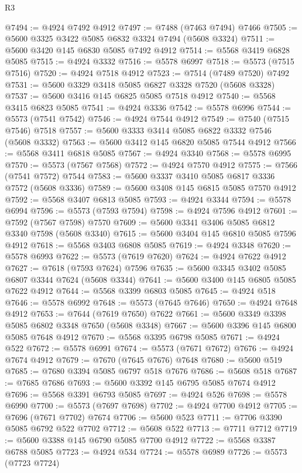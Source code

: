 \begin{lexlean}{R3}
\begin{coremodule}
@7494 := @4924 @7492 @4912
@7497 := @7488 (@7463 @7494) @7466
@7505 := @5600 @3325 @3422 @5085 @6832 @3324 @7494 (@5608 @3324)
@7511 := @5600 @3420 @145 @6830 @5085 @7492 @4912
@7514 := @5568 @3419 @6828 @5085
@7515 := @4924 @3332
@7516 := @5578 @6997
@7518 := @5573 (@7515 @7516)
@7520 := @4924 @7518 @4912
@7523 := @7514 (@7489 @7520) @7492
@7531 := @5600 @3329 @3418 @5085 @6827 @3328 @7520 (@5608 @3328)
@7537 := @5600 @3416 @145 @6825 @5085 @7518 @4912
@7540 := @5568 @3415 @6823 @5085
@7541 := @4924 @3336
@7542 := @5578 @6996
@7544 := @5573 (@7541 @7542)
@7546 := @4924 @7544 @4912
@7549 := @7540 (@7515 @7546) @7518
@7557 := @5600 @3333 @3414 @5085 @6822 @3332 @7546 (@5608 @3332)
@7563 := @5600 @3412 @145 @6820 @5085 @7544 @4912
@7566 := @5568 @3411 @6818 @5085
@7567 := @4924 @3340
@7568 := @5578 @6995
@7570 := @5573 (@7567 @7568)
@7572 := @4924 @7570 @4912
@7575 := @7566 (@7541 @7572) @7544
@7583 := @5600 @3337 @3410 @5085 @6817 @3336 @7572 (@5608 @3336)
@7589 := @5600 @3408 @145 @6815 @5085 @7570 @4912
@7592 := @5568 @3407 @6813 @5085
@7593 := @4924 @3344
@7594 := @5578 @6994
@7596 := @5573 (@7593 @7594)
@7598 := @4924 @7596 @4912
@7601 := @7592 (@7567 @7598) @7570
@7609 := @5600 @3341 @3406 @5085 @6812 @3340 @7598 (@5608 @3340)
@7615 := @5600 @3404 @145 @6810 @5085 @7596 @4912
@7618 := @5568 @3403 @6808 @5085
@7619 := @4924 @3348
@7620 := @5578 @6993
@7622 := @5573 (@7619 @7620)
@7624 := @4924 @7622 @4912
@7627 := @7618 (@7593 @7624) @7596
@7635 := @5600 @3345 @3402 @5085 @6807 @3344 @7624 (@5608 @3344)
@7641 := @5600 @3400 @145 @6805 @5085 @7622 @4912
@7644 := @5568 @3399 @6803 @5085
@7645 := @4924 @518
@7646 := @5578 @6992
@7648 := @5573 (@7645 @7646)
@7650 := @4924 @7648 @4912
@7653 := @7644 (@7619 @7650) @7622
@7661 := @5600 @3349 @3398 @5085 @6802 @3348 @7650 (@5608 @3348)
@7667 := @5600 @3396 @145 @6800 @5085 @7648 @4912
@7670 := @5568 @3395 @6798 @5085
@7671 := @4924 @522
@7672 := @5578 @6991
@7674 := @5573 (@7671 @7672)
@7676 := @4924 @7674 @4912
@7679 := @7670 (@7645 @7676) @7648
@7680 := @5600 @519
@7685 := @7680 @3394 @5085 @6797 @518 @7676
@7686 := @5608 @518
@7687 := @7685 @7686
@7693 := @5600 @3392 @145 @6795 @5085 @7674 @4912
@7696 := @5568 @3391 @6793 @5085
@7697 := @4924 @526
@7698 := @5578 @6990
@7700 := @5573 (@7697 @7698)
@7702 := @4924 @7700 @4912
@7705 := @7696 (@7671 @7702) @7674
@7706 := @5600 @523
@7711 := @7706 @3390 @5085 @6792 @522 @7702
@7712 := @5608 @522
@7713 := @7711 @7712
@7719 := @5600 @3388 @145 @6790 @5085 @7700 @4912
@7722 := @5568 @3387 @6788 @5085
@7723 := @4924 @534
@7724 := @5578 @6989
@7726 := @5573 (@7723 @7724)

\end{coremodule}
\end{lexlean}
